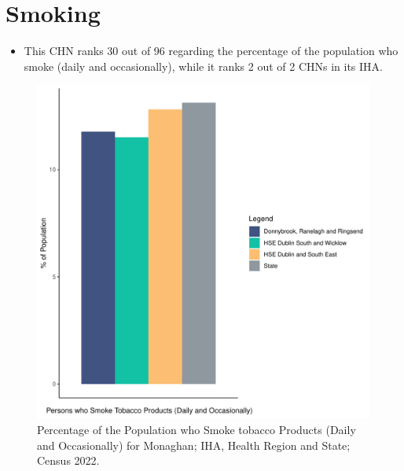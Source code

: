 \documentclass{article}
\begin{document}
\pagebreak

\section{Smoking}\label{sect:Smoking}
\begin{itemize}
\item This CHN ranks  30 out of 96 regarding the percentage of the population who smoke (daily and occasionally), while it ranks   2 out of 2 CHNs in its IHA.
\end{itemize}
\begin{figure}[H]
	\centering
	\includegraphics[width = 120mm]{../figures/SmokingED.pdf}
	\caption{Percentage of the Population who Smoke tobacco Products (Daily and Occasionally) for Monaghan; IHA, Health Region and State; Census 2022.}
	\label{fig:2ae19629-1a6a-13a3-e055-000000000001}
	\end{figure}
	
\end{document}
